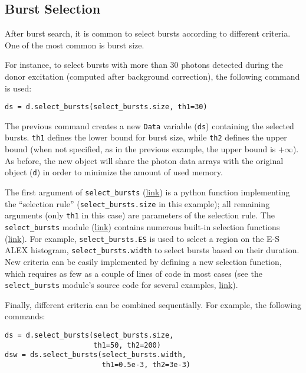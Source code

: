 \subsection{Burst Selection}
\label{sec:burstsel}

After burst search, it is common to select bursts according to different
criteria. One of the most common is burst size.

For instance, to select bursts with more than 30 photons detected during the donor excitation 
(computed after background correction), the following command is used:

\begin{lstlisting}
ds = d.select_bursts(select_bursts.size, th1=30)
\end{lstlisting}

The previous command creates a new \verb|Data| variable (\verb|ds|) containing
the selected bursts. \verb|th1| defines the lower bound for burst size, while 
\verb|th2| defines the upper bound (when not specified, as in the previous example,
the upper bound is $+\infty$).
As before, the new object will share the photon data
arrays with the original object (\verb|d|) in order to minimize the amount 
of used memory.

The first argument of \verb|select_bursts|
(\href{http://fretbursts.readthedocs.org/en/latest/data_class.html#burst-selection-methods}{link})
is a python function implementing the ``selection rule'' (\verb|select_bursts.size| in this example);
all remaining arguments (only \verb|th1| in this case) are parameters of the selection rule.
The \verb|select_bursts| module
(\href{http://fretbursts.readthedocs.org/en/latest/burst_selection.html}{link})
contains numerous built-in selection functions
(\href{http://fretbursts.readthedocs.org/en/latest/burst_selection.html#module-fretbursts.select_bursts}{link}).
For example,
\verb|select_bursts.ES|
is used to select a region on the E-S ALEX histogram,
\verb|select_bursts.width|
to select bursts based on their duration.
New criteria can be easily implemented by defining a new selection function,
which requires as few as a couple of lines of code in most cases (see the
\verb|select_bursts| module's source code
for several examples,
\href{https://github.com/tritemio/FRETBursts/blob/master/fretbursts/select_bursts.py}{link}).

Finally, different criteria can be combined sequentially.
For example, the following commands:

\begin{lstlisting}
ds = d.select_bursts(select_bursts.size,
                     th1=50, th2=200)
dsw = ds.select_bursts(select_bursts.width,
                       th1=0.5e-3, th2=3e-3)
\end{lstlisting}

